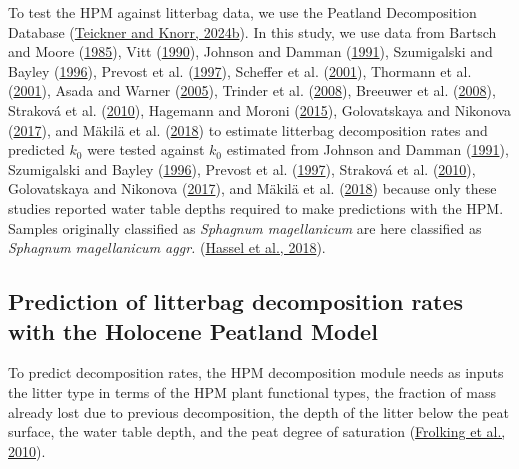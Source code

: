 \documentclass[
  12pt,
]{article}
\begin{document}
To test the HPM against litterbag data, we use the Peatland Decomposition Database (\protect\hyperlink{ref-Teickner.2024c}{Teickner and Knorr, 2024b}). In this study, we use data from Bartsch and Moore (\protect\hyperlink{ref-Bartsch.1985}{1985}), Vitt (\protect\hyperlink{ref-Vitt.1990}{1990}), Johnson and Damman (\protect\hyperlink{ref-Johnson.1991}{1991}), Szumigalski and Bayley (\protect\hyperlink{ref-Szumigalski.1996}{1996}), Prevost et al. (\protect\hyperlink{ref-Prevost.1997}{1997}), Scheffer et al. (\protect\hyperlink{ref-Scheffer.2001}{2001}), Thormann et al. (\protect\hyperlink{ref-Thormann.2001}{2001}), Asada and Warner (\protect\hyperlink{ref-Asada.2005b}{2005}), Trinder et al. (\protect\hyperlink{ref-Trinder.2008}{2008}), Breeuwer et al. (\protect\hyperlink{ref-Breeuwer.2008}{2008}), Straková et al. (\protect\hyperlink{ref-Strakova.2010}{2010}), Hagemann and Moroni (\protect\hyperlink{ref-Hagemann.2015}{2015}), Golovatskaya and Nikonova (\protect\hyperlink{ref-Golovatskaya.2017}{2017}), and Mäkilä et al. (\protect\hyperlink{ref-Makila.2018}{2018}) to estimate litterbag decomposition rates and predicted \(k_0\) were tested against \(k_0\) estimated from Johnson and Damman (\protect\hyperlink{ref-Johnson.1991}{1991}), Szumigalski and Bayley (\protect\hyperlink{ref-Szumigalski.1996}{1996}), Prevost et al. (\protect\hyperlink{ref-Prevost.1997}{1997}), Straková et al. (\protect\hyperlink{ref-Strakova.2010}{2010}), Golovatskaya and Nikonova (\protect\hyperlink{ref-Golovatskaya.2017}{2017}), and Mäkilä et al. (\protect\hyperlink{ref-Makila.2018}{2018}) because only these studies reported water table depths required to make predictions with the HPM. Samples originally classified as \emph{Sphagnum magellanicum} are here classified as \emph{Sphagnum magellanicum aggr.} (\protect\hyperlink{ref-Hassel.2018}{Hassel et al., 2018}).

\hypertarget{sdm-003-methods-2}{%
\subsection{Prediction of litterbag decomposition rates with the Holocene Peatland Model}\label{sdm-003-methods-2}}

To predict decomposition rates, the HPM decomposition module needs as inputs the litter type in terms of the HPM plant functional types, the fraction of mass already lost due to previous decomposition, the depth of the litter below the peat surface, the water table depth, and the peat degree of saturation (\protect\hyperlink{ref-Frolking.2010}{Frolking et al., 2010}).
\end{document}
